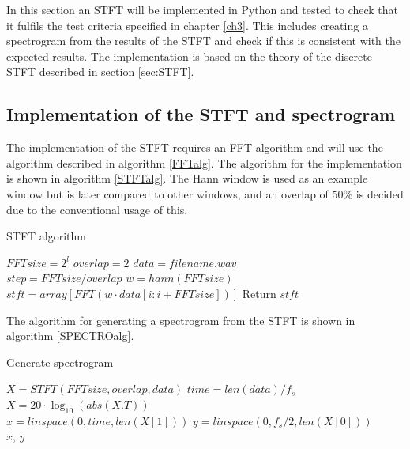 In this section an STFT will be implemented in Python and tested to check that it fulfils the test criteria specified in chapter \ref{ch3}. This includes creating a spectrogram from the results of the STFT and check if this is consistent with the expected results. The implementation is based on the theory of the discrete STFT described in section \ref{sec:STFT}.

\subsection{Implementation of the STFT and spectrogram}
The implementation of the STFT requires an FFT algorithm and will use the algorithm described in algorithm \ref{FFTalg}. The algorithm for the implementation is shown in algorithm \ref{STFTalg}. The Hann window is used as an example window but is later compared to other windows, and an overlap of 50\% is decided due to the conventional usage of this.

\begin{algorithm}[H]
\caption{STFT algorithm}
\label{STFTalg}
\begin{algorithmic}[1]
\State $FFTsize= 2^l$ 
\State $overlap=2$ 
\State $data = filename.wav$ \\
\State $step=FFTsize/overlap$
\State $w=hann(FFTsize)$ 
\State $stft = array[FFT(w\cdot data[i:i+FFTsize])]$
\EndFor
\State Return $stft$
\EndProcedure
\end{algorithmic}
\end{algorithm}
The algorithm for generating a spectrogram from the STFT is shown in algorithm \ref{SPECTROalg}.
\begin{algorithm}[H]
\caption{Generate spectrogram}
\label{SPECTROalg}
\begin{algorithmic}[1]
	\State $X=STFT(FFTsize,overlap,data)$ 					
	\State $time=len(data)/f_s$ 
	\State $X=20\cdot \log_{10}(abs(X.T))$ \\
	\State $x=linspace(0,time,len(X[1]))$ 		
	\State $y=linspace(0,f_s/2,len(X[0]))$ 	\\
	\Return $x$, $y$
\EndProcedure
\end{algorithmic}
\end{algorithm}


